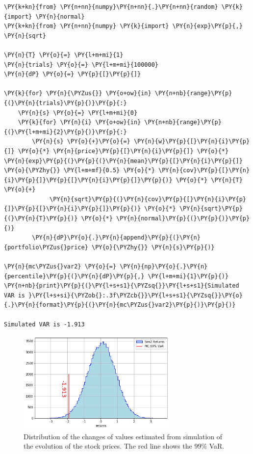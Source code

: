 \begin{codebox}
\begin{Verbatim}[commandchars=\\\{\}]
\PY{k+kn}{from} \PY{n+nn}{numpy}\PY{n+nn}{.}\PY{n+nn}{random} \PY{k}{import} \PY{n}{normal}
\PY{k+kn}{from} \PY{n+nn}{numpy} \PY{k}{import} \PY{n}{exp}\PY{p}{,} \PY{n}{sqrt}
		
\PY{n}{T} \PY{o}{=} \PY{l+m+mi}{1}
\PY{n}{trials} \PY{o}{=} \PY{l+m+mi}{100000}
\PY{n}{dP} \PY{o}{=} \PY{p}{[}\PY{p}{]}
		
\PY{k}{for} \PY{n}{\PYZus{}} \PY{o+ow}{in} \PY{n+nb}{range}\PY{p}{(}\PY{n}{trials}\PY{p}{)}\PY{p}{:}
    \PY{n}{s} \PY{o}{=} \PY{l+m+mi}{0}
    \PY{k}{for} \PY{n}{i} \PY{o+ow}{in} \PY{n+nb}{range}\PY{p}{(}\PY{l+m+mi}{2}\PY{p}{)}\PY{p}{:}
        \PY{n}{s} \PY{o}{+}\PY{o}{=} \PY{n}{w}\PY{p}{[}\PY{n}{i}\PY{p}{]} \PY{o}{*} \PY{n}{price}\PY{p}{[}\PY{n}{i}\PY{p}{]} \PY{o}{*} \PY{n}{exp}\PY{p}{(}\PY{p}{(}\PY{n}{mean}\PY{p}{[}\PY{n}{i}\PY{p}{]} \PY{o}{\PYZhy{}} \PY{l+m+mf}{0.5} \PY{o}{*} \PY{n}{cov}\PY{p}{[}\PY{n}{i}\PY{p}{]}\PY{p}{[}\PY{n}{i}\PY{p}{]}\PY{p}{)} \PY{o}{*} \PY{n}{T} \PY{o}{+} 
             \PY{n}{sqrt}\PY{p}{(}\PY{n}{cov}\PY{p}{[}\PY{n}{i}\PY{p}{]}\PY{p}{[}\PY{n}{i}\PY{p}{]}\PY{p}{)} \PY{o}{*} \PY{n}{sqrt}\PY{p}{(}\PY{n}{T}\PY{p}{)} \PY{o}{*} \PY{n}{normal}\PY{p}{(}\PY{p}{)}\PY{p}{)}
        \PY{n}{dP}\PY{o}{.}\PY{n}{append}\PY{p}{(}\PY{n}{portfolio\PYZus{}price} \PY{o}{\PYZhy{}} \PY{n}{s}\PY{p}{)}
		
\PY{n}{mc\PYZus{}var2} \PY{o}{=} \PY{n}{np}\PY{o}{.}\PY{n}{percentile}\PY{p}{(}\PY{n}{dP}\PY{p}{,} \PY{l+m+mi}{1}\PY{p}{)}
\PY{n+nb}{print}\PY{p}{(}\PY{l+s+s1}{\PYZsq{}}\PY{l+s+s1}{Simulated VAR is }\PY{l+s+si}{\PYZob{}:.3f\PYZcb{}}\PY{l+s+s1}{\PYZsq{}}\PY{o}{.}\PY{n}{format}\PY{p}{(}\PY{n}{mc\PYZus{}var2}\PY{p}{)}\PY{p}{)}

Simulated VAR is -1.913
\end{Verbatim}
\end{codebox}

\begin{figure}[htb]
	\centering
	\includegraphics[width=0.7\textwidth]{figures/sim2_var}
	\caption{Distribution of the changes of values estimated from simulation of the evolution of the stock prices. The red line shows the 99\% VaR.}
	\label{fig:mc2_var}
\end{figure}


